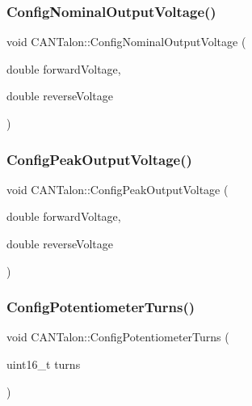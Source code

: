 \subsubsection{\texorpdfstring{Config\+Nominal\+Output\+Voltage()}{ConfigNominalOutputVoltage()}}
{\footnotesize\ttfamily void C\+A\+N\+Talon\+::\+Config\+Nominal\+Output\+Voltage (\begin{DoxyParamCaption}\item[{double}]{forward\+Voltage,  }\item[{double}]{reverse\+Voltage }\end{DoxyParamCaption})}

\mbox{\label{class_c_a_n_talon_a123f54ab4a1c1c741349de9f5db675fe}} 
\subsubsection{\texorpdfstring{Config\+Peak\+Output\+Voltage()}{ConfigPeakOutputVoltage()}}
{\footnotesize\ttfamily void C\+A\+N\+Talon\+::\+Config\+Peak\+Output\+Voltage (\begin{DoxyParamCaption}\item[{double}]{forward\+Voltage,  }\item[{double}]{reverse\+Voltage }\end{DoxyParamCaption})}

\mbox{\label{class_c_a_n_talon_a83b286995d244b8d9e7530c190ab8eca}} 
\subsubsection{\texorpdfstring{Config\+Potentiometer\+Turns()}{ConfigPotentiometerTurns()}}
{\footnotesize\ttfamily void C\+A\+N\+Talon\+::\+Config\+Potentiometer\+Turns (\begin{DoxyParamCaption}\item[{uint16\+\_\+t}]{turns }\end{DoxyParamCaption})\hspace{0.3cm}{\ttfamily [override]}}


